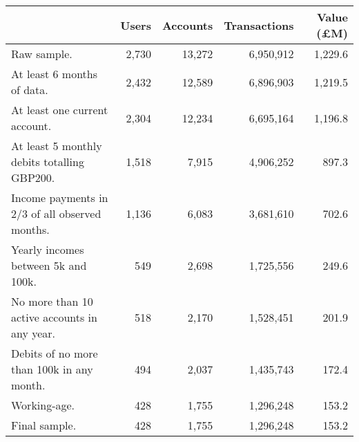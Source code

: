 \begin{tabular}{lrrrr}
\toprule
                                               & Users & Accounts & Transactions & Value (\pounds M) \\
\midrule
                                   Raw sample. & 2,730 &   13,272 &    6,950,912 &           1,229.6 \\
                    At least 6 months of data. & 2,432 &   12,589 &    6,896,903 &           1,219.5 \\
                 At least one current account. & 2,304 &   12,234 &    6,695,164 &           1,196.8 \\
   At least 5 monthly debits totalling GBP200. & 1,518 &    7,915 &    4,906,252 &             897.3 \\
Income payments in 2/3 of all observed months. & 1,136 &    6,083 &    3,681,610 &             702.6 \\
           Yearly incomes between 5k and 100k. &   549 &    2,698 &    1,725,556 &             249.6 \\
  No more than 10 active accounts in any year. &   518 &    2,170 &    1,528,451 &             201.9 \\
     Debits of no more than 100k in any month. &   494 &    2,037 &    1,435,743 &             172.4 \\
                                  Working-age. &   428 &    1,755 &    1,296,248 &             153.2 \\
                                 Final sample. &   428 &    1,755 &    1,296,248 &             153.2 \\
\bottomrule
\end{tabular}
